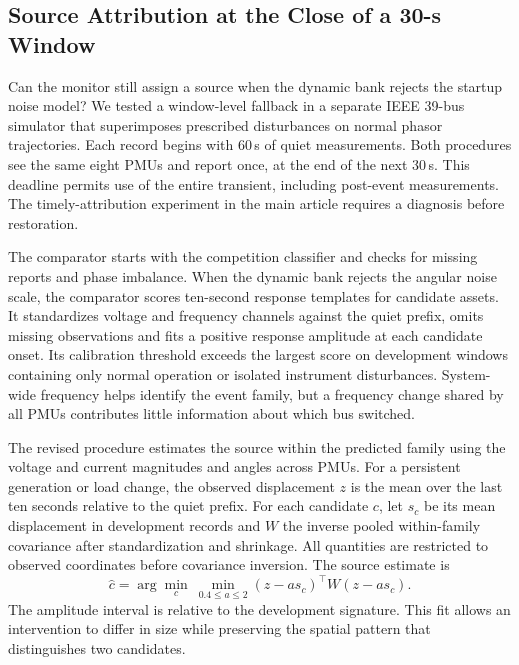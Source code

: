 \subsection{Source Attribution at the Close of a 30-s Window}
\label{sec:window-source-localization}
Can the monitor still assign a source when the dynamic bank rejects the
startup noise model? We tested a window-level fallback in a separate
IEEE 39-bus simulator that superimposes prescribed disturbances on normal
phasor trajectories. Each record begins with 60\,s of quiet measurements.
Both procedures see the same eight PMUs and report once, at the end of
the next 30\,s. This deadline permits use of the entire transient,
including post-event measurements. The timely-attribution experiment in
the main article requires a diagnosis before restoration.

The comparator starts with the competition classifier and checks for
missing reports and phase imbalance. When the dynamic bank rejects the
angular noise scale, the comparator scores ten-second response templates
for candidate assets. It standardizes voltage and frequency channels
against the quiet prefix, omits missing observations and fits a positive
response amplitude at each candidate onset. Its calibration threshold
exceeds the largest score on development windows containing only normal
operation or isolated instrument disturbances. System-wide frequency
helps identify the event family, but a frequency change shared by all
PMUs contributes little information about which bus switched.

The revised procedure estimates the source within the predicted family
using the voltage and current magnitudes and angles across PMUs. For a
persistent generation or load change, the observed displacement $z$ is
the mean over the last ten seconds relative to the quiet prefix. For
each candidate $c$, let $s_c$ be its mean displacement in development
records and $W$ the inverse pooled within-family covariance after
standardization and shrinkage. All quantities are restricted to
observed coordinates before covariance inversion. The source estimate is
\[
   \widehat c=\arg\min_c\ \min_{0.4\leq a\leq2}
         (z-a s_c)^\top W(z-a s_c).
\]
The amplitude interval is relative to the development signature. This
fit allows an intervention to differ in size while preserving the
spatial pattern that distinguishes two candidates.


